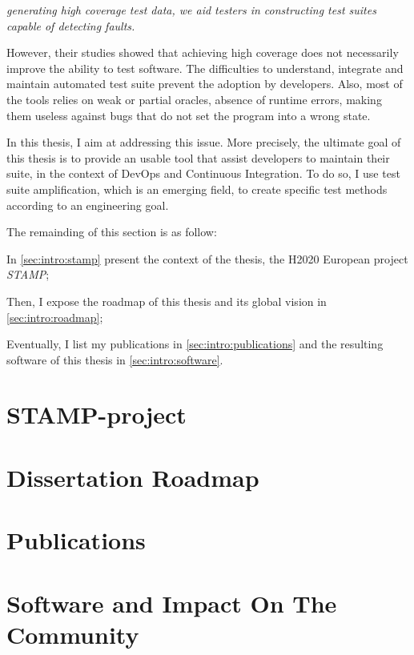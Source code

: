 \emph{generating high coverage test data, we aid testers in constructing test suites capable of detecting faults.}

However, their studies showed that achieving high coverage does not necessarily improve the ability to test software.
The difficulties to understand, integrate and maintain automated test suite prevent the adoption by developers.
Also, most of the tools relies on weak or partial oracles, \eg absence of runtime errors, making them useless against bugs that do not set the program into a wrong state.

In this thesis, I aim at addressing this issue.
More precisely, the ultimate goal of this thesis is to provide an usable tool that assist developers to maintain their suite, in the context of DevOps and Continuous Integration.
To do so, I use test suite amplification, which is an emerging field, to create specific test methods according to an engineering goal.

The remainding of this section is as follow:

In \autoref{sec:intro:stamp} present the context of the thesis, the H2020 European project \emph{STAMP};

Then, I expose the roadmap of this thesis and its global vision in \autoref{sec:intro:roadmap};

Eventually, I list my publications in \autoref{sec:intro:publications} and the resulting software of this thesis in \autoref{sec:intro:software}.

\section{STAMP-project}
\label{sec:intro:stamp}

\section{Dissertation Roadmap}
\label{sec:intro:roadmap}

\section{Publications}
\label{sec:intro:publications}

\section{Software and Impact On The Community}
\label{sec:intro:software}